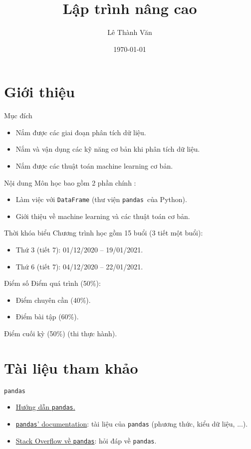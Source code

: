 \documentclass[11pt]{beamer}
\author{Lê Thành Văn}
\title{Lập trình nâng cao}
\institute{Khoa Hệ thống thông tin quản lý}
\date{\today}
\newcommand{\pandas}{\texttt{pandas}}
\begin{document}
	\begin{frame}
		\titlepage
	\end{frame}

	\section{Giới thiệu}
	\begin{frame}{Mục đích}
		\begin{itemize}
			\item Nắm được các giai đoạn phân tích dữ liệu.
			\item Nắm và vận dụng các kỹ năng cơ bản khi phân tích dữ liệu.
			\item Nắm được các thuật toán machine learning cơ bản.
		\end{itemize}
	\end{frame}

	\begin{frame}{Nội dung}
		Môn học bao gồm 2 phần chính :
		\begin{itemize}
			\item Làm việc với \texttt{DataFrame} (thư viện \pandas\ của Python).
			\item Giới thiệu về machine learning và các thuật toán cơ bản.
		\end{itemize}
	\end{frame}

	\begin{frame}{Thời khóa biểu}
		Chương trình học gồm 15 buổi (3 tiết một buổi):
		\begin{itemize}
			\item Thứ 3 (tiết 7): 01/12/2020 -- 19/01/2021.
			\item Thứ 6 (tiết 7): 04/12/2020 -- 22/01/2021.
		\end{itemize}
	\end{frame}

	\begin{frame}{Điểm số}
		Điểm quá trình (50\%):
		\begin{itemize}
			\item Điểm chuyên cần (40\%).
			\item Điểm bài tập (60\%).
		\end{itemize}
		Điểm cuối kỳ (50\%) (thi thực hành).
	\end{frame}

	\section{Tài liệu tham khảo}
	\begin{frame}{\pandas}
		\begin{itemize}
			\item \href{https://www.tutorialspoint.com/python_pandas/index.htm}{Hướng dẫn \pandas.}
			\item \href{https://pandas.pydata.org/docs/}{\pandas ' documentation}: tài liệu của \pandas{} (phương thức, kiểu dữ liệu, ...).
			\item \href{https://stackoverflow.com/questions/tagged/pandas}{Stack Overflow về \pandas{}}: hỏi đáp về \pandas.
		\end{itemize}
	\end{frame}
\end{document}
